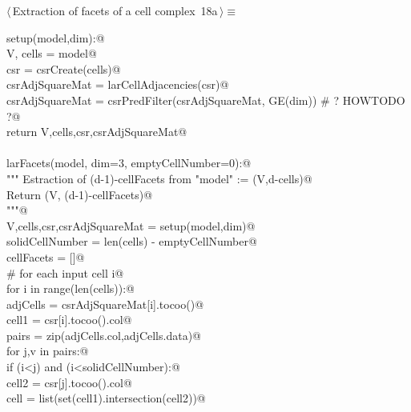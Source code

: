 \documentclass[11pt,oneside]{article}    %
\begin{document}
\begin{flushleft} \small \label{scrap28}
\protect{}$\langle\,$Extraction of facets of a cell complex\nobreak\ {\footnotesize 18a}$\,\rangle\equiv$
\vspace{-1ex}
\begin{list}{}{} \item
\mbox{}\verb@def setup(model,dim):@\\
\mbox{}\verb@    V, cells = model@\\
\mbox{}\verb@    csr = csrCreate(cells)@\\
\mbox{}\verb@    csrAdjSquareMat = larCellAdjacencies(csr)@\\
\mbox{}\verb@    csrAdjSquareMat = csrPredFilter(csrAdjSquareMat, GE(dim)) # ? HOWTODO ?@\\
\mbox{}\verb@    return V,cells,csr,csrAdjSquareMat@\\
\mbox{}\verb@@\\
\mbox{}\verb@def larFacets(model, dim=3, emptyCellNumber=0):@\\
\mbox{}\verb@    """ Estraction of (d-1)-cellFacets from "model" := (V,d-cells)@\\
\mbox{}\verb@        Return (V, (d-1)-cellFacets)@\\
\mbox{}\verb@        """@\\
\mbox{}\verb@    V,cells,csr,csrAdjSquareMat = setup(model,dim)@\\
\mbox{}\verb@    solidCellNumber = len(cells) - emptyCellNumber@\\
\mbox{}\verb@    cellFacets = []@\\
\mbox{}\verb@    # for each input cell i@\\
\mbox{}\verb@    for i in range(len(cells)):@\\
\mbox{}\verb@        adjCells = csrAdjSquareMat[i].tocoo()@\\
\mbox{}\verb@        cell1 = csr[i].tocoo().col@\\
\mbox{}\verb@        pairs = zip(adjCells.col,adjCells.data)@\\
\mbox{}\verb@        for j,v in pairs:@\\
\mbox{}\verb@            if (i<j) and (i<solidCellNumber):@\\
\mbox{}\verb@                cell2 = csr[j].tocoo().col@\\
\mbox{}\verb@                cell = list(set(cell1).intersection(cell2))@\\

\end{list}
\end{flushleft}
\end{document}
